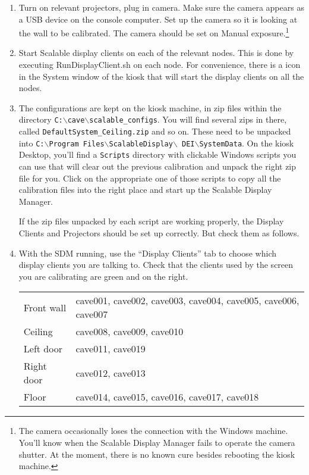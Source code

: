 \documentclass[11pt]{article}
\newcommand{\cmd}[1]{\texttt{#1}\xspace}
\newcommand{\menu}[1]{``#1''\xspace}
\newcommand{\button}[1]{\framebox{\textsf{#1}\xspace}}
\newcommand{\bs}{$\backslash$}
\begin{document}
\begin{enumerate}

\item Turn on relevant projectors, plug in camera.  Make sure the camera
  appears as a USB device on the console computer.  Set up the camera
  so it is looking at the wall to be calibrated.  The camera should be
  set on Manual exposure.\footnote{The camera occasionally loses the
    connection with the Windows machine.  You'll know when the
    Scalable Display Manager fails to operate the camera shutter.  At
    the moment, there is no known cure besides rebooting the kiosk
    machine.}

\item Start Scalable display clients on each of the relevant nodes.
  This is done by executing RunDisplayClient.sh on each node.  For
  convenience, there is a \button{Calibrate} icon in the System window of
  the kiosk that will start the display clients on all the nodes.

\item The configurations are kept on the kiosk machine, in zip files
  within the directory \hbox{\cmd{C:\bs cave\bs scalable\_configs}}.
  You will find several zips in there, called
  \cmd{DefaultSystem\_Ceiling.zip} and so on.  These need to be
  unpacked into \hbox{\cmd{C:\bs Program Files\bs ScalableDisplay\bs
      DEI\bs SystemData}}.  On the kiosk Desktop, you'll find a
  \cmd{Scripts} directory with clickable Windows scripts you can use
  that will clear out the previous calibration and unpack the right
  zip file for you.  Click on the appropriate one of those scripts to
  copy all the calibration files into the right place and start up the
  Scalable Display Manager.

  If the zip files unpacked by each script are working properly, the
  Display Clients and Projectors should be set up correctly.  But
  check them as follows.

\item With the SDM running, use the \menu{Display Clients} tab to choose
  which display clients you are talking to.  Check that the clients
  used by the screen you are calibrating are
  green and on the right.

  \begin{center}
  \begin{tabular}{ll}
    Front wall & cave001, cave002, cave003, cave004, cave005, cave006,
                 cave007 \\
    Ceiling & cave008, cave009, cave010 \\
    Left door & cave011, cave019 \\
    Right door & cave012, cave013 \\
    Floor & cave014, cave015, cave016, cave017, cave018 \\
  \end{tabular}
\end{center}


\end{enumerate}
\end{document}
